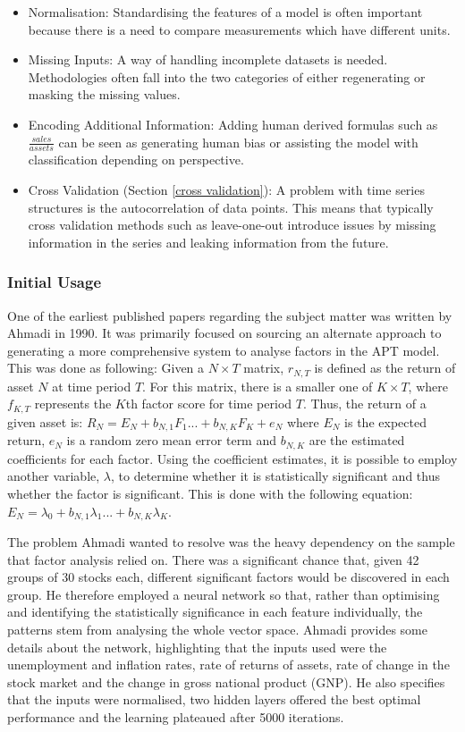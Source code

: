 \documentclass[10pt,onecolumn,letterpaper]{article}
\begin{document}
\begin{itemize}
	\item Normalisation: Standardising the features of a model is often important because there is a need to compare measurements which have different units. 
	\item Missing Inputs: A way of handling incomplete datasets is needed. Methodologies often fall into the two categories of either regenerating or masking the missing values. 
	\item Encoding Additional Information: Adding human derived formulas such as $\frac{sales}{assets}$ can be seen as generating human bias or assisting the model with classification depending on perspective. 
	\item Cross Validation (Section \ref{cross validation}): A problem with time series structures is the autocorrelation of data points. This means that typically cross validation methods such as leave-one-out introduce issues by missing information in the series and leaking information from the future. 
\end{itemize}

\subsubsection{Initial Usage}

One of the earliest published papers\cite{Ahmadi} regarding the subject matter was written by Ahmadi in 1990. It was primarily focused on sourcing an alternate approach to generating a more comprehensive system to analyse factors in the APT model. This was done as following: Given a $N\times T$ matrix, $r_{N,T}$ is defined as the return of asset $N$ at time period $T$. For this matrix, there is a smaller one of $K\times T$, where $f_{K,T}$ represents the $K$th factor score for time period $T$. Thus, the return of a given asset is: 
$R_{N} = E_{N} + b_{N,1}F_{1} ... + b_{N,K}F_{K} + e_{N}$ where $E_{N}$ is the expected return, $e_{N}$ is a random zero mean error term and  $b_{N,K}$ are the estimated coefficients for each factor. Using the coefficient estimates, it is possible to employ another variable, $\lambda$, to determine whether it is statistically significant and thus whether the factor is significant. This is done with the following equation: $E_{N} = \lambda_{0} + b_{N,1}\lambda_{1} ... + b_{N,K}\lambda_{K}$.

The problem Ahmadi wanted to resolve was the heavy dependency on the sample that factor analysis relied on. There was a significant chance that, given 42 groups of 30 stocks each, different significant factors would be discovered in each group. He therefore employed a neural network so that, rather than optimising and identifying the statistically significance in each feature individually, the patterns stem from analysing the whole vector space. Ahmadi provides some details about the network, highlighting that the inputs used were the unemployment and inflation rates, rate of returns of assets, rate of change in the stock market and the change in gross national product (GNP). He also specifies that the inputs were normalised, two hidden layers offered the best optimal performance and the learning plateaued after 5000 iterations. 
\end{document}

